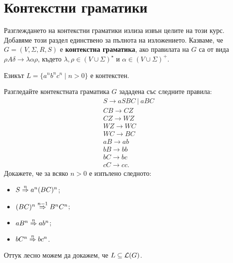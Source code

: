 \section{Контекстни граматики}

Разглеждането на контекстни граматики излиза извън целите на този курс. Добавяме този раздел единствено за пълнота на изложението.
Казваме, че $G = (V,\Sigma,R,S)$ е {\bf контекстна граматика}, ако правилата на $G$ са от вида
$\rho A \delta \to \lambda \alpha \rho$, където $\lambda,\rho \in (V\cup\Sigma)^\star$ и $\alpha \in (V\cup\Sigma)^+$.

\begin{extra}
\begin{example}
  Езикът $L = \{a^nb^nc^n \mid n > 0\}$ е контекстен.
\end{example}
\begin{hint}
  Разгледайте контекстната граматика $G$ зададена със следните правила:
  \begin{align*}
    & S \to aSBC\ |\ aBC\\
    & CB \to CZ\\
    & CZ \to WZ\\
    & WZ \to WC\\
    & WC \to BC\\
    & aB \to ab\\
    & bB \to bb\\
    & bC \to bc\\
    & cC \to cc.
  \end{align*}
  Докажете, че за всяко $n > 0$ е изпълено следното:
  \begin{itemize}
  \item
    $S \stackrel{{n}}{\Rightarrow} a^n(BC)^n$;
  \item
    $(BC)^n \stackrel{{n-1}}{\Rightarrow} B^nC^n$;
  \item
    $aB^n \stackrel{{n}}{\Rightarrow} ab^n$;
  \item
    $bC^n \stackrel{{n}}{\Rightarrow} bc^n$.
  \end{itemize}
  Оттук лесно можем да докажем, че $L \subseteq \mathcal{L}(G)$.
\end{hint}
\end{extra}
